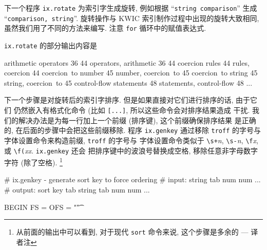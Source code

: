 {下一个程序 \texttt{ix.rotate} 为索引字生成旋转, 例如根据 ``\texttt{string
comparison}'' 生成 ``\texttt{comparison, string}''. 旋转操作与 KWIC
索引制作过程中出现的旋转大致相同, 虽然我们用了不同的方法来编写. 注意 
\texttt{for} 循环中的赋值表达式.
\texttt{ix.rotate} 的部分输出内容是
\begin{file}
    arithmetic operators        36 44
    operators, arithmetic       36 44
    coercion rules      44
    rules, coercion     44
    coercion~to number  45
    number, coercion~to 45
    coercion~to string  45
    string, coercion~to 45
    control-flow statements     48
    statements, control-flow    48
    ...
\end{file}

下一个步骤是对旋转后的索引字排序. 但是如果直接对它们进行排序的话, 由于它们
仍然嵌入有格式化命令 (比如 \texttt{[...]}, 所以这些命令会对排序结果造成
干扰. 我们的解决办法是为每一行加上一个前缀 (排序键), 这个前缀确保排序结果
是正确的, 在后面的步骤中会把这些前缀移除. 程序 \texttt{ix.genkey} 通过移除 
\texttt{troff} 的字号与字体设置命令来构造前缀, \texttt{troff} 的字号与 
字体设置命令类似于 \verb'\s+'\textit{n}, \verb'\s-'\textit{n},
\verb'\f'\textit{x}, 或 \verb'\f('\textit{xx}. \texttt{ix.genkey} 还会
把排序键中的波浪号替换成空格, 移除任意非字母数字字符 (除了空格).
\footnote{从前面的输出中可以看到, 对于现代 \texttt{sort} 命令来说,
这个步骤是多余的 --- 译者注}
\begin{awkcode}
    # ix.genkey - generate sort key to force ordering
    #   input:  string tab num num ...
    #   output: sort key tab string tab num num ...

    BEGIN { FS = OFS = "\t" }


\end{awkcode}}
